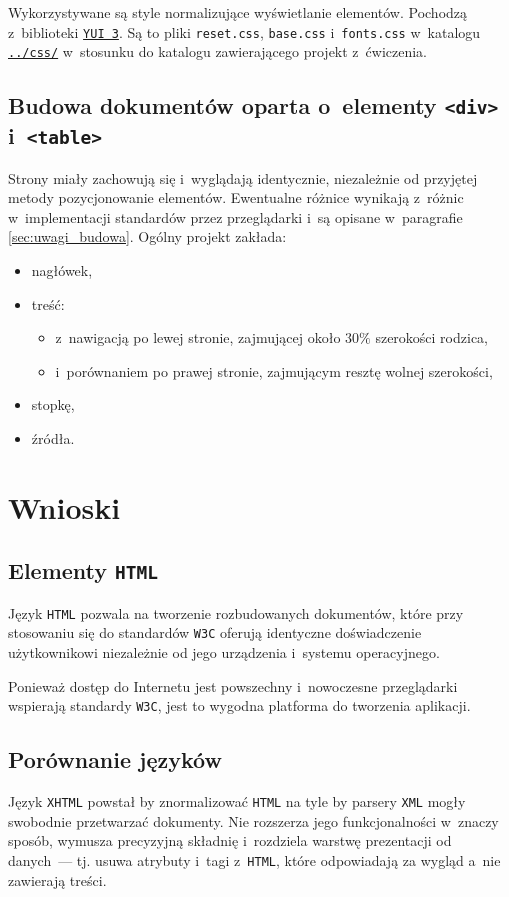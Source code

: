 \documentclass[10pt,a4paper]{article}
\newcommand{\f}[1]{\texttt{#1}}
\begin{document}
Wykorzystywane są style normalizujące wyświetlanie elementów. Pochodzą
z~biblioteki \f{\href{http://yuilibrary.com/}{YUI~3}}. Są to pliki
\f{reset.css}, \f{base.css} i~\f{fonts.css} w~katalogu
\f{\href{https://github.com/student-tomasz/pi-laboratoria/tree/master/css}{../css/}}
w~stosunku do katalogu zawierającego projekt z~ćwiczenia.

\subsection{Budowa dokumentów oparta o~elementy \f{<div>} i~\f{<table>}}
Strony miały zachowują się i~wyglądają identycznie, niezależnie od przyjętej
metody pozycjonowanie elementów. Ewentualne różnice wynikają z~różnic
w~implementacji standardów przez przeglądarki i~są opisane w~paragrafie
\ref{sec:uwagi_budowa}. Ogólny projekt zakłada:
\begin{itemize}
  \item nagłówek,
  \item treść:
  \begin{itemize}
    \item z~nawigacją po lewej stronie, zajmującej około $30\%$ szerokości
      rodzica,
    \item i~porównaniem po prawej stronie, zajmującym resztę wolnej szerokości,
  \end{itemize}
  \item stopkę,
  \item źródła.
\end{itemize}



\section{Wnioski}

\subsection{Elementy \f{HTML}}
Język \f{HTML} pozwala na tworzenie rozbudowanych dokumentów, które przy
stosowaniu się do standardów \f{W3C} oferują identyczne doświadczenie
użytkownikowi niezależnie od jego urządzenia i~systemu operacyjnego.

Ponieważ dostęp do Internetu jest powszechny i~nowoczesne przeglądarki wspierają
standardy \f{W3C}, jest to wygodna platforma do tworzenia aplikacji.

\subsection{Porównanie języków}
Język \f{XHTML} powstał by znormalizować \f{HTML} na tyle by parsery \f{XML}
mogły swobodnie przetwarzać dokumenty. Nie rozszerza jego funkcjonalności
w~znaczy sposób, wymusza precyzyjną składnię i~rozdziela warstwę prezentacji
od danych~--- tj. usuwa atrybuty i~tagi z~\f{HTML}, które odpowiadają za wygląd
a~nie zawierają treści.
\end{document}
